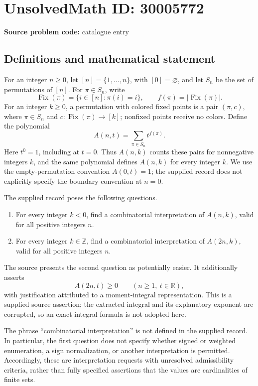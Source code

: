 \documentclass[11pt]{article}
\newcommand{\Z}{\mathbb{Z}}
\newcommand{\R}{\mathbb{R}}
\begin{document}
\section*{UnsolvedMath ID: 30005772}
\textbf{Source problem code:} catalogue entry
\subsection{Definitions and mathematical statement}
For an integer \(n\geq 0\), let \([n]=\{1,\ldots,n\}\), with \([0]=\varnothing\), and let \(S_n\) be the set of permutations of \([n]\). For \(\pi\in S_n\), write
\[
\operatorname{Fix}(\pi)=\{i\in[n]:\pi(i)=i\},\qquad f(\pi)=|\operatorname{Fix}(\pi)|.
\]
For an integer \(k\geq0\), a permutation with colored fixed points is a pair \((\pi,c)\), where \(\pi\in S_n\) and \(c:\operatorname{Fix}(\pi)\to[k]\); nonfixed points receive no colors. Define the polynomial
\[
A(n,t)=\sum_{\pi\in S_n}t^{f(\pi)}.
\]
Here \(t^0=1\), including at \(t=0\). Thus \(A(n,k)\) counts these pairs for nonnegative integers \(k\), and the same polynomial defines \(A(n,k)\) for every integer \(k\). We use the empty-permutation convention \(A(0,t)=1\); the supplied record does not explicitly specify the boundary convention at \(n=0\).

The supplied record poses the following questions.
\begin{enumerate}
\item For every integer \(k<0\), find a combinatorial interpretation of \(A(n,k)\), valid for all positive integers \(n\).
\item For every integer \(k\in\Z\), find a combinatorial interpretation of \(A(2n,k)\), valid for all positive integers \(n\).
\end{enumerate}
The source presents the second question as potentially easier. It additionally asserts
\[
A(2n,t)\geq0\qquad(n\geq1,\ t\in\R),
\]
with justification attributed to a moment-integral representation. This is a supplied source assertion; the extracted integral and its explanatory exponent are corrupted, so an exact integral formula is not adopted here.

The phrase ``combinatorial interpretation'' is not defined in the supplied record. In particular, the first question does not specify whether signed or weighted enumeration, a sign normalization, or another interpretation is permitted. Accordingly, these are interpretation requests with unresolved admissibility criteria, rather than fully specified assertions that the values are cardinalities of finite sets.
\end{document}
